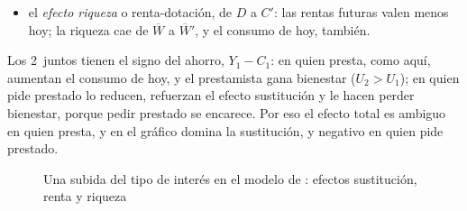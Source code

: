 \documentclass[11pt]{article}
\begin{document}
\begin{itemize}
\begin{itemize}
  \item el \emph{efecto riqueza} o renta-dotación, de $D$ a $C'$: las rentas futuras valen menos hoy; la riqueza cae de $\overline W$ a $\overline W'$, y el consumo de hoy, también.
  \end{itemize}
  Los 2~juntos tienen el signo del ahorro, $Y_1-C_1$: en quien presta, como aquí, aumentan el consumo de hoy, y el prestamista gana bienestar ($U_2>U_1$); en quien pide prestado lo reducen, refuerzan el efecto sustitución y le hacen perder bienestar, porque pedir prestado se encarece. Por eso el efecto total es ambiguo en quien presta, y en el gráfico domina la sustitución, y negativo en quien pide prestado.
  \begin{figure}[H]
  \centering
  \caption{Una subida del tipo de interés en el modelo de : efectos sustitución, renta y riqueza}\label{fig:fisher-tipo-interes}
  \end{figure}
\end{itemize}
\end{document}
